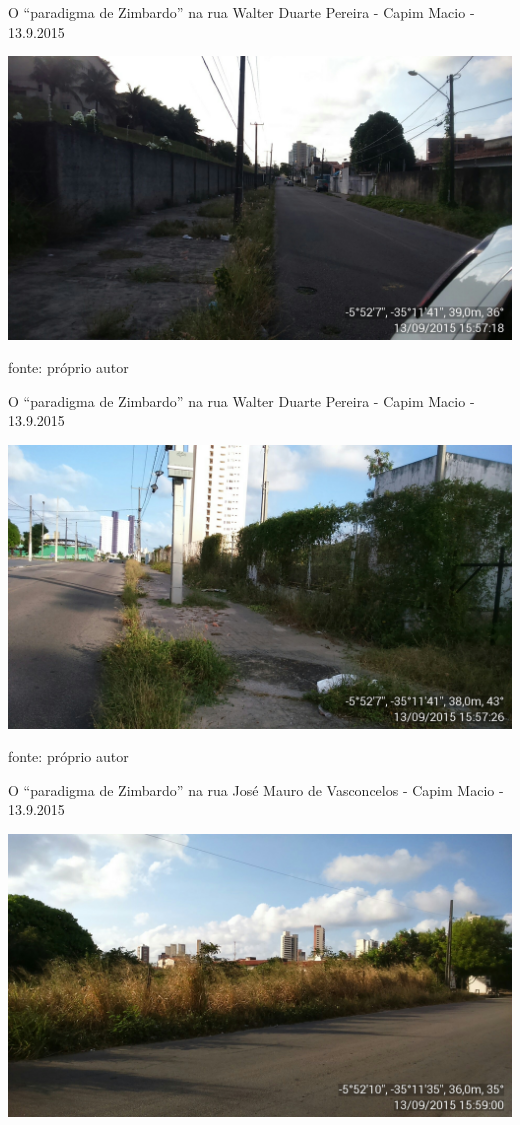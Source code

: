 \documentclass[
	12pt,				%
	openright,			%
	twoside,			%
	a4paper,			%
	chapter=TITLE,		%
	section=TITLE,		%
	subsection=TITLE,	%
	subsubsection=TITLE,%
	spanish,            %
	english,			%
	brazil				%
	]{abntex2}
\begin{document}
\begin{anexosenv}
\begin{foto}[!htpb]
	\caption{\label{FotoG}O “paradigma de Zimbardo” na rua Walter Duarte Pereira - Capim Macio - 13.9.2015}
	\begin{center}
		\includegraphics[scale=0.23]{walter1.jpg}
	\end{center}
	\ABNTEXchapterfont\small{fonte: próprio autor}
\end{foto}
\begin{foto}[!htpb]
	\caption{\label{FotoH}O “paradigma de Zimbardo” na rua Walter Duarte Pereira - Capim Macio - 13.9.2015}
	\begin{center}
		\includegraphics[scale=0.23]{walter2.jpg}
	\end{center}
	\ABNTEXchapterfont\small{fonte: próprio autor}
\end{foto}
\begin{foto}[!htpb]
	\caption{\label{FotoI}O “paradigma de Zimbardo” na rua José Mauro de Vasconcelos - Capim Macio - 13.9.2015}
	\begin{center}
		\includegraphics[scale=0.23]{Mauro1.jpg}

\end{center}
\end{foto}
\end{anexosenv}
\end{document}
